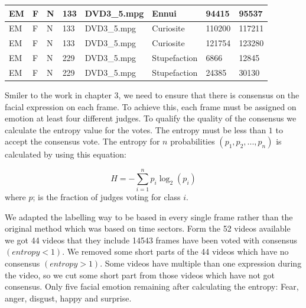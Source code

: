 \begin{table}[tb]
{\begin{tabular}{@{}|l|l|l|l|l|l|l|l|@{}}
			EM                & F                   & N                   & 133              & DVD3\_5.mpg       & Ennui                & 94415              & 95537            \\ \midrule
			EM                & F                   & N                   & 133              & DVD3\_5.mpg       & Curiosite            & 110200             & 117211           \\ \midrule
			EM                & F                   & N                   & 133              & DVD3\_5.mpg       & Curiosite            & 121754             & 123280           \\ \midrule
			EM                & F                   & N                   & 229              & DVD3\_5.mpg       & Stupefaction         & 6866               & 12845            \\ \midrule
			EM                & F                   & N                   & 229              & DVD3\_5.mpg       & Stupefaction         & 24385              & 30130            \\ \bottomrule
	\end{tabular}}
\end{table}



Smiler to the work in chapter 3, we need to ensure that there is consensus on the facial expression on each frame. To achieve this, each frame must be assigned on emotion at least four different judges. To qualify the quality of the consensus we calculate the entropy value for the votes. The entropy must be less than $1$ to accept the consensus vote. The entropy for $n$ probabilities $(p_1,p_2, ... ,p_n)$ is calculated by using this equation:



\begin{equation}
H =- \sum_{i=1}^{n}  p_i  \log_2 (p_i)
\end{equation}
where \textit{$p$}; is the fraction of judges voting for class $i$.


We adapted the labelling way to be based in every single frame rather than the original method which was based on time sectors. 
Form the 52 videos available we got 44 videos that they include 14543 frames have been voted with consensus $(entropy<1)$. We removed some short parts of the 44 videos which have no consensus $(entropy>1)$. Some videos have multiple than one expression during the video, so we cut some short part from those videos which have not got consensus. Only five facial emotion remaining after calculating the entropy: Fear, anger, disgust, happy and surprise.      

